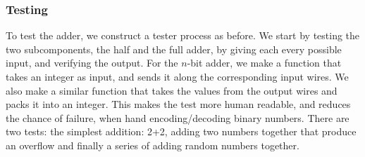 \subsubsection*{Testing}
To test the adder, we construct a tester process as before. We start by testing
the two subcomponents, the half and the full adder, by giving each every
possible input, and verifying the output. For the $n$-bit adder, we make a
function that takes an integer as input, and sends it along the corresponding
input wires. We also make a similar function that takes the values from the
output wires and packs it into an integer. This makes the test more human
readable, and reduces the chance of failure, when hand encoding/decoding binary
numbers. There are two tests: the simplest addition: 2+2, adding two numbers
together that produce an overflow and finally a series of adding random
numbers together.
